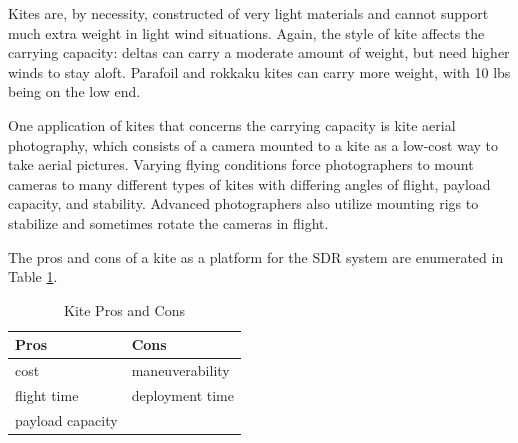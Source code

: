 Kites are, by necessity, constructed of very light materials and cannot support much extra weight in light wind situations. Again, the style of kite affects the carrying capacity: deltas can carry a moderate amount of weight, but need higher winds to stay aloft. Parafoil and rokkaku kites can carry more weight, with 10 lbs being on the low end.\par
One application of kites that concerns the carrying capacity is kite aerial photography, which consists of a camera mounted to a kite as a low-cost way to take aerial pictures. Varying flying conditions force photographers to mount cameras to many different types of kites with differing angles of flight, payload capacity, and stability. Advanced photographers also utilize mounting rigs to stabilize and sometimes rotate the cameras in flight\cite{kite_iqp}.\par
The pros and cons of a kite as a platform for the SDR system are enumerated in Table \ref{table:kite_pc}.
\begin{table}[ht]
\centering
\caption{Kite Pros and Cons}
\label{table:kite_pc}
\begin{tabular}{l|l}
  Pros & Cons \\ \hline
  cost & maneuverability \\
  flight time & deployment time \\
  payload capacity & \\
\end{tabular}
\end{table}\par

